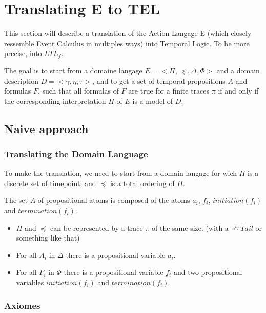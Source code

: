 \section{Translating E to TEL}\label{sec:etotemp}

This section will describe a translation of the Action Langage E (which closely ressemble Event Calculus in multiples ways) into Temporal Logic.
To be more precise, into $LTL_f$.

The goal is to start from a domaine langage $E=<\Pi,\preceq,\Delta,\Phi>$ and a domain description $D=<\gamma,\eta,\tau>$, and to get a set of temporal propositions $A$ and formulas $F$, such that all formulas of $F$ are true for a finite traces $\pi$ if and only if the corresponding interpretation $H$ of $E$ is a model of $D$.

\subsection{Naive approach}

\subsubsection{Translating the Domain Language}

To make the translation, we need to start from a domain langage for wich $\Pi$ is a discrete set of timepoint, and $\preceq$ is a total ordering of $\Pi$.

The set $A$ of propositional atoms is composed of the atoms $a_i$, $f_i$, $initiation(f_i)$ and $termination(f_i)$.

\begin{itemize}
  \item $\Pi$ and $\preceq$ can be represented by a trace $\pi$ of the same size. (with a $\circ^{t_f}Tail$ or something like that)
  \item For all $A_i$ in $\Delta$ there is a propositional variable $a_i$.
  \item For all $F_i$ in $\Phi$ there is a propositional variable $f_i$ and two propositional variables $initiation(f_i)$ and $termination(f_i)$.
\end{itemize}

\subsubsection{Axiomes}

